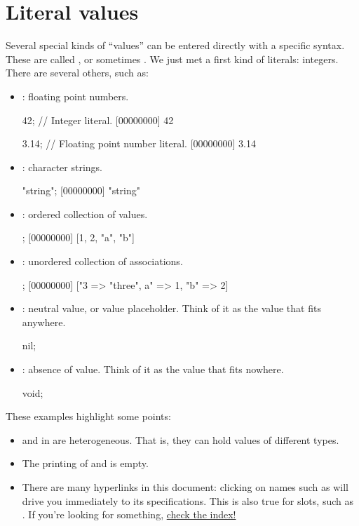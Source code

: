 \section{Literal values}

Several special kinds of ``values'' can be entered directly with a specific
syntax.  These are called , or sometimes .  We just met a first kind of literals: integers.  There are
several others, such as:

\begin{itemize}
\item {}: floating point numbers.
\begin{urbiscript}
42; // Integer literal.
[00000000] 42

3.14; // Floating point number literal.
[00000000] 3.14
\end{urbiscript}

\item {}: character strings.
\begin{urbiscript}
"string";
[00000000] "string"
\end{urbiscript}

\item {}: ordered collection of values.
\begin{urbiscript}
[1, 2, "a", "b"];
[00000000] [1, 2, "a", "b"]
\end{urbiscript}

\item {}: unordered collection of
  associations.
\begin{urbiscript}
["a" => 1, "b" => 2, 3 => "three"];
[00000000] ["3 => "three", a" => 1, "b" => 2]
\end{urbiscript}

\item {}: neutral value, or value placeholder. Think of it as
  the value that fits anywhere.
\begin{urbiscript}
nil;
\end{urbiscript}

\item {}: absence of value. Think of it as the value that fits
  nowhere.
\begin{urbiscript}
void;
\end{urbiscript}
\end{itemize}

These examples highlight some points:
\begin{itemize}
\item {} and  in
  \us are heterogeneous. That is, they can hold values of different types.
\item The printing of  and  is empty.
\item There are many hyperlinks in this document: clicking on names such as
   will drive you immediately to its specifications.
  This is also true for slots, such as .  If you're
  looking for something, \hyperref[sec:index]{check the index!}
\end{itemize}

